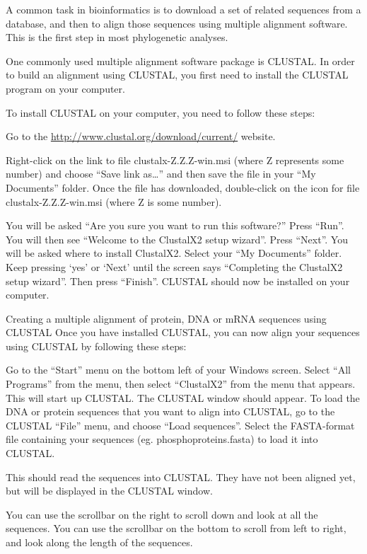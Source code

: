 \documentclass[
]{book}
\begin{document}
A common task in bioinformatics is to download a set of related sequences from a database, and then to align those sequences using multiple alignment software. This is the first step in most phylogenetic analyses.

One commonly used multiple alignment software package is CLUSTAL. In order to build an alignment using CLUSTAL, you first need to install the CLUSTAL program on your computer.

To install CLUSTAL on your computer, you need to follow these steps:

Go to the \url{http://www.clustal.org/download/current/} website.

Right-click on the link to file clustalx-Z.Z.Z-win.msi (where Z represents some number) and choose ``Save link as\ldots{}'' and then save the file in your ``My Documents'' folder.
Once the file has downloaded, double-click on the icon for file clustalx-Z.Z.Z-win.msi (where Z is some number).

You will be asked ``Are you sure you want to run this software?'' Press ``Run''.
You will then see ``Welcome to the ClustalX2 setup wizard''. Press ``Next''.
You will be asked where to install ClustalX2. Select your ``My Documents'' folder.
Keep pressing `yes' or `Next' until the screen says ``Completing the ClustalX2 setup wizard''. Then press ``Finish''.
CLUSTAL should now be installed on your computer.

Creating a multiple alignment of protein, DNA or mRNA sequences using CLUSTAL
Once you have installed CLUSTAL, you can now align your sequences using CLUSTAL by following these steps:

Go to the ``Start'' menu on the bottom left of your Windows screen. Select ``All Programs'' from the menu, then select ``ClustalX2'' from the menu that appears. This will start up CLUSTAL.
The CLUSTAL window should appear. To load the DNA or protein sequences that you want to align into CLUSTAL, go to the CLUSTAL ``File'' menu, and choose ``Load sequences''.
Select the FASTA-format file containing your sequences (eg. phosphoproteins.fasta) to load it into CLUSTAL.

This should read the sequences into CLUSTAL. They have not been aligned yet, but will be displayed in the CLUSTAL window.

You can use the scrollbar on the right to scroll down and look at all the sequences. You can use the scrollbar on the bottom to scroll from left to right, and look along the length of the sequences.
\end{document}
